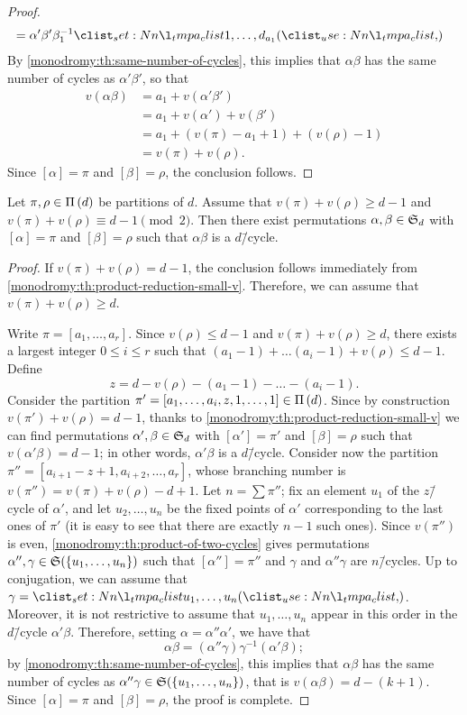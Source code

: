 \begin{proof}
\begin{align*}
&=\alpha'\beta'\beta_1^{-1}\cycle{1,\ldots,d_{a_1}}
\end{align*}
By \cref{monodromy:th:same-number-of-cycles}, this implies that $\alpha\beta$ has the same number of cycles as $\alpha'\beta'$, so that
\begin{align*}
v(\alpha\beta)&=a_1+v(\alpha'\beta')\\
&=a_1+v(\alpha')+v(\beta')\\
&=a_1+(v(\pi)-a_1+1)+(v(\rho)-1)\\
&=v(\pi)+v(\rho).
\end{align*}
Since $[\alpha]=\pi$ and $[\beta]=\rho$, the conclusion follows.
\end{proof}

\begin{proposition}\label{monodromy:th:product-reduction-odd}
Let $\pi,\rho\in\Pi\left(d\right)$ be partitions of $d$. Assume that $v(\pi)+v(\rho)\ge d-1$ and $v(\pi)+v(\rho)\equiv d-1\pmod{2}$. Then there exist permutations $\alpha,\beta\in\symgroup[d]$ with $[\alpha]=\pi$ and $[\beta]=\rho$ such that $\alpha\beta$ is a $d$\=/cycle.
\end{proposition}
\begin{proof}
If $v(\pi)+v(\rho)=d-1$, the conclusion follows immediately from \cref{monodromy:th:product-reduction-small-v}. Therefore, we can assume that $v(\pi)+v(\rho)\ge d$.

Write $\pi=[a_1,\ldots,a_r]$. Since $v(\rho)\le d-1$ and $v(\pi)+v(\rho)\ge d$, there exists a largest integer $0\le i\le r$ such that $(a_1-1)+\ldots(a_i-1)+v(\rho)\le d-1$. Define
\[
z=d-v(\rho)-(a_1-1)-\ldots-(a_i-1).
\]
Consider the partition $\pi'=[a_1,\ldots,a_i,z,1,\ldots,1]\in\Pi\left(d\right)$. Since by construction $v(\pi')+v(\rho)=d-1$, thanks to \cref{monodromy:th:product-reduction-small-v} we can find permutations $\alpha',\beta\in\symgroup[d]$ with $[\alpha']=\pi'$ and $[\beta]=\rho$ such that $v(\alpha'\beta)=d-1$; in other words, $\alpha'\beta$ is a $d$\=/cycle. Consider now the partition $\pi''=[a_{i+1}-z+1,a_{i+2},\ldots,a_r]$, whose branching number is $v(\pi'')=v(\pi)+v(\rho)-d+1$. Let $n=\sum\pi''$; fix an element $u_1$ of the $z$\=/cycle of $\alpha'$, and let $u_2,\ldots,u_n$ be the fixed points of $\alpha'$ corresponding to the last ones of $\pi'$ (it is easy to see that there are exactly $n-1$ such ones). Since $v(\pi'')$ is even, \cref{monodromy:th:product-of-two-cycles} gives permutations $\alpha'',\gamma\in\symgroup(\{u_1,\ldots,u_n\})$ such that $[\alpha'']=\pi''$ and $\gamma$ and $\alpha''\gamma$ are $n$\=/cycles. Up to conjugation, we can assume that $\gamma=\cycle{u_1,\ldots,u_n}$. Moreover, it is not restrictive to assume that $u_1,\ldots,u_n$ appear in this order in the $d$\=/cycle $\alpha'\beta$. Therefore, setting $\alpha=\alpha''\alpha'$, we have that
\[
\alpha\beta=(\alpha''\gamma)\gamma^{-1}(\alpha'\beta);
\]
by \cref{monodromy:th:same-number-of-cycles}, this implies that $\alpha\beta$ has the same number of cycles as $\alpha''\gamma\in\symgroup(\{u_1,\ldots,u_n\})$, that is $v(\alpha\beta)=d-(k+1)$. Since $[\alpha]=\pi$ and $[\beta]=\rho$, the proof is complete.
\end{proof}

